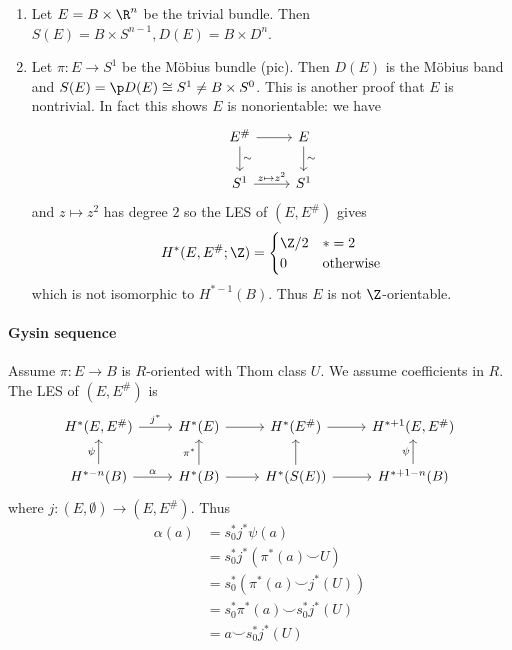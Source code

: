 \documentclass[a4paper]{article}
\renewcommand{\b}{\p}
\newcommand*{\cp}{\smile} %
\begin{document}
\begin{eg}\leavevmode
  \begin{enumerate}
  \item Let \(E = B \times \R^n\) be the trivial bundle. Then \(S(E) = B \times S^{n - 1}, D(E) = B \times D^n\).
  \item Let \(\pi: E \to S^1\) be the Möbius bundle (pic). Then \(D(E)\) is the Möbius band and \(S(E) = \b D(E) \cong S^1 \neq B \times S^0\). This is another proof that \(E\) is nontrivial. In fact this shows \(E\) is nonorientable: we have
    \[
      \begin{tikzcd}
        E^\# \ar[r] \ar[d, "\sim"] & E \ar[d, "\sim"] \\
        S^1 \ar[r, "z \mapsto z^2"] & S^1
      \end{tikzcd}
    \]
    and \(z \mapsto z^2\) has degree \(2\) so the LES of \((E, E^\#)\) gives
    \[
      H^*(E, E^\#; \Z) =
      \begin{cases}
        \Z/2 & * = 2 \\
        0 & \text{otherwise}
      \end{cases}
    \]
    which is not isomorphic to \(H^{* - 1}(B)\). Thus \(E\) is not \(\Z\)-orientable.
  \end{enumerate}
\end{eg}

\paragraph{Gysin sequence}

Assume \(\pi: E \to B\) is \(R\)-oriented with Thom class \(U\). We assume coefficients in \(R\). The LES of \((E, E^\#)\) is
\[
  \begin{tikzcd}
    H^*(E, E^\#) \ar[r, "j^*"] & H^*(E) \ar[r] & H^*(E^\#) \ar[r] & H^{* + 1}(E, E^\#) \\
    H^{* - n}(B) \ar[r, "\alpha"] \ar[u, "\psi"] & H^* (B) \ar[u, "\pi^*"] \ar[r] & H^*(S(E)) \ar[u] \ar[r] & H^{* + 1 - n}(B) \ar[u, "\psi"]
  \end{tikzcd}
\]
where \(j: (E, \emptyset) \to (E, E^\#)\). Thus
\begin{align*}
  \alpha(a)
  &= s_0^* j^* \psi(a) \\
  &= s_0^* j^*(\pi^*(a) \cp U) \\
  &= s_0^*(\pi^*(a) \cp j^*(U)) \\
  &= s_0^* \pi^*(a) \cp s_0^* j^*(U) \\
  &= a \cp s_0^* j^*(U)
\end{align*}
\end{document}
